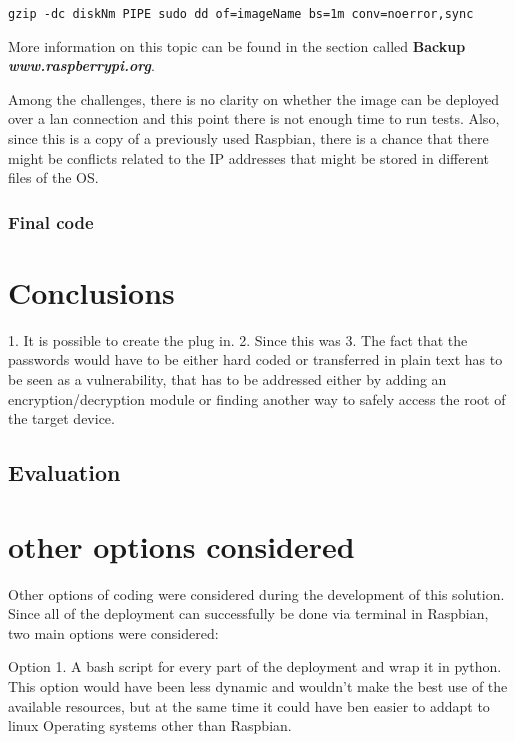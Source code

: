 \verb|gzip -dc diskNm PIPE sudo dd of=imageName bs=1m conv=noerror,sync|

More information on this topic can be found in the section
called \textbf{Backup} \textbf{\textit{www.raspberrypi.org}}.
	
Among the challenges, there is no clarity on whether the image can be
deployed over a lan connection and this point there is not enough time
to run tests.  Also, since this is a copy of a previously used
Raspbian, there is a chance that there might be conflicts related to
the IP addresses that might be stored in different files of the OS.
	
\subsubsection{Final code}
	
	
	
	
\section{Conclusions}

	
	1. It is possible to create the plug in.
	2. Since this was 
	3. The fact that the passwords would have to be either hard coded
  or transferred in plain text has to be seen as a vulnerability, 
  that has to be addressed either by adding an encryption/decryption
  module or finding another way to safely access the root of 
  the target device.
	
\subsection{Evaluation}

	
\section{other options considered}

Other options of coding were considered during the development of this
solution.  Since all of the deployment can successfully be done via
terminal in Raspbian, two main options were considered:
	
Option 1. A bash script for every part of the deployment and wrap it
in python. This option would have been less dynamic and wouldn't make
the best use of the available resources, but at the same time it could
have ben easier to addapt to linux Operating systems other than
Raspbian.
  
